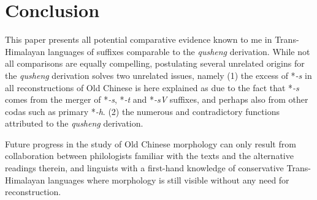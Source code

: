 \documentclass[oneside,a4paper,11pt]{article}
\newcommand{\ipa}[1]{{\phon\textit{\mbox{#1}}}}
\begin{document}
\section{Conclusion}
This paper presents all potential comparative evidence known to me in Trans-Himalayan languages of suffixes comparable to the \textit{qusheng} derivation. While not all comparisons are equally compelling, postulating several unrelated origins for the \textit{qusheng} derivation solves two unrelated issues, namely (1) the excess of *\ipa{-s} in all reconstructions of Old Chinese is here explained as  due to the fact that *\ipa{-s} comes from the merger of *\ipa{-s}, *\ipa{-t} and *\ipa{-sV} suffixes, and perhaps also from other codas such as primary *\ipa{-h}. (2) the numerous and contradictory functions attributed to the \textit{qusheng} derivation.

Future progress in the study of Old Chinese morphology can only result from collaboration between philologists familiar with the texts and the alternative readings therein, and linguists with a first-hand knowledge of conservative Trans-Himalayan languages where morphology is still visible without any need for reconstruction.



\end{document}
